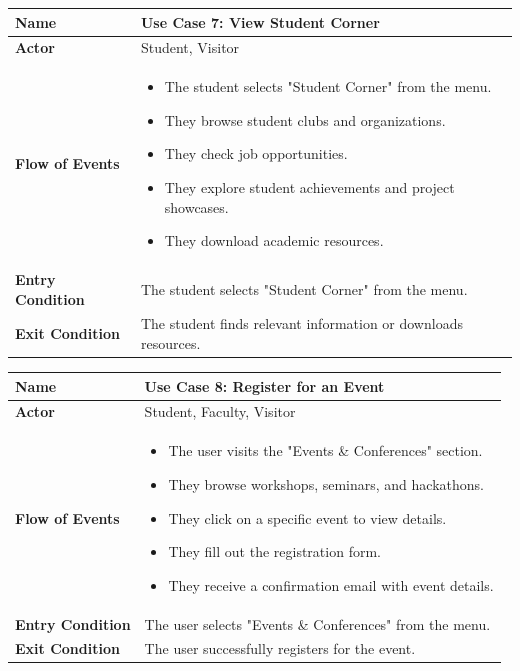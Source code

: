 \documentclass[11pt]{article}
\begin{document}
\begin{center}
\begin{tabular}{ | >{\bfseries}m{6em} | m{10cm} | }
  \hline
  \textbf{Name} & Use Case 7: View Student Corner \\
  \hline
  \textbf{Actor} & Student, Visitor \\
  \hline
  \textbf{Flow of Events} & 
  \begin{itemize}
      \item The student selects "Student Corner" from the menu.
      \item They browse student clubs and organizations.
      \item They check job opportunities.
      \item They explore student achievements and project showcases.
      \item They download academic resources.
  \end{itemize} \\
  \hline
  \textbf{Entry Condition} & The student selects "Student Corner" from the menu. \\
  \hline
  \textbf{Exit Condition} & The student finds relevant information or downloads resources. \\
  \hline
\end{tabular}
\end{center}

\begin{center}
\begin{tabular}{ | >{\bfseries}m{6em} | m{10cm} | }
  \hline
  \textbf{Name} & Use Case 8: Register for an Event \\
  \hline
  \textbf{Actor} & Student, Faculty, Visitor \\
  \hline
  \textbf{Flow of Events} & 
  \begin{itemize}
      \item The user visits the "Events \& Conferences" section.
      \item They browse workshops, seminars, and hackathons.
      \item They click on a specific event to view details.
      \item They fill out the registration form.
      \item They receive a confirmation email with event details.
  \end{itemize} \\
  \hline
  \textbf{Entry Condition} & The user selects "Events \& Conferences" from the menu. \\
  \hline
  \textbf{Exit Condition} & The user successfully registers for the event. \\
  \hline
\end{tabular}
\end{center}
\end{document}

